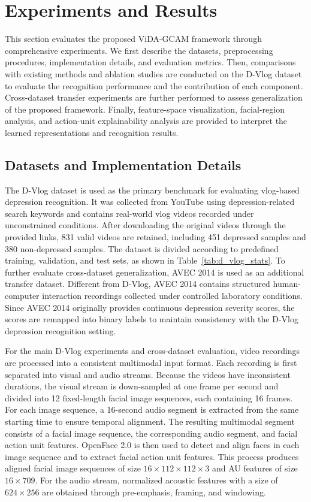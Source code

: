 \documentclass[a4paper,fleqn]{cas-dc}
\begin{document}
\section{Experiments and Results}
This section evaluates the proposed ViDA-GCAM framework through comprehensive experiments. We first describe the datasets, preprocessing procedures, implementation details, and evaluation metrics. Then, comparisons with existing methods and ablation studies are conducted on the D-Vlog dataset to evaluate the recognition performance and the contribution of each component. Cross-dataset transfer experiments are further performed to assess generalization of the proposed framework. Finally, feature-space visualization, facial-region analysis, and action-unit explainability analysis are provided to interpret the learned representations and recognition results.



\subsection{Datasets and Implementation Details}
The D-Vlog dataset\cite{dataset:dvlog} is used as the primary benchmark for evaluating vlog-based depression recognition. It was collected from YouTube using depression-related search keywords and contains real-world vlog videos recorded under unconstrained conditions. After downloading the original videos through the provided links, 831 valid videos are retained, including 451 depressed samples and 380 non-depressed samples. The dataset is divided according to predefined training, validation, and test sets, as shown in Table~\ref{tab:d_vlog_stats}. 
To further evaluate cross-dataset generalization, AVEC 2014\cite{dataset:AVEC2014} is used as an additional transfer dataset. Different from D-Vlog, AVEC 2014 contains structured human-computer interaction recordings collected under controlled laboratory conditions. Since AVEC 2014 originally provides continuous depression severity scores, the scores are remapped into binary labels to maintain consistency with the D-Vlog depression recognition setting.

For the main D-Vlog experiments and cross-dataset evaluation, video recordings are processed into a consistent multimodal input format. Each recording is first separated into visual and audio streams. Because the videos have inconsistent durations, the visual stream is down-sampled at one frame per second and divided into 12 fixed-length facial image sequences, each containing 16 frames. For each image sequence, a 16-second audio segment is extracted from the same starting time to ensure temporal alignment. The resulting multimodal segment consists of a facial image sequence, the corresponding audio segment, and facial action unit features. OpenFace 2.0\cite{preprocess:OpenFace} is then used to detect and align faces in each image sequence and to extract facial action unit features\cite{preprocess:OpenFace_AU}. This process produces aligned facial image sequences of size $16\times112\times112\times3$ and AU features of size $16\times709$. For the audio stream, normalized acoustic features with a size of $624\times256$ are obtained through pre-emphasis, framing, and windowing\cite{preprocess:audio}. 
\end{document}
